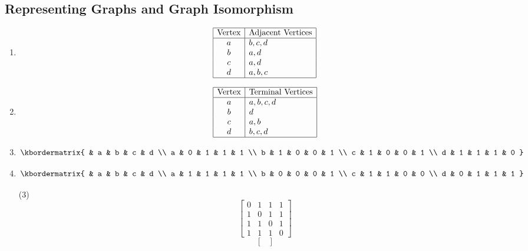 \documentclass[12pt, A4]{article}
\newcommand{\enumset}[1]{\setcounter{enumi}{#1}}
\begin{document}
		\subsection{Representing Graphs and Graph Isomorphism}
			\begin{enumerate}
				\item
					\[\begin{array}{|c|l|}\hline
						\text{Vertex} & \text{Adjacent Vertices} \\\hline
						a & b, c, d \\
						b & a, d\\
						c & a, d \\
						d & a, b, c \\\hline
					\end{array}\]
				\enumset{2}
				\item
					\[\begin{array}{|c|l|}\hline
						\text{Vertex} & \text{Terminal Vertices} \\\hline
						a & a, b, c, d \\
						b & d \\
						c & a, b \\
						d & b, c, d \\\hline
					\end{array}\]
				\enumset{4}
				\item
					\[\kbordermatrix{
								& a & b & c & d \\
								a & 0 & 1 & 1 & 1 \\
								b & 1 & 0 & 0 & 1 \\
								c & 1 & 0 & 0 & 1 \\
								d & 1 & 1 & 1 & 0
					}\]
				\enumset{6}
				\item
					\[\kbordermatrix{
								& a & b & c & d \\
								a & 1 & 1 & 1 & 1 \\
								b & 0 & 0 & 0 & 1 \\
								c & 1 & 1 & 0 & 0 \\
								d & 0 & 1 & 1 & 1
					}\]
				\enumset{8}
					\begin{tasks}(3)
						\task
							\[\begin{bmatrix}
								0 & 1 & 1 & 1 \\
								1 & 0 & 1 & 1 \\
								1 & 1 & 0 & 1 \\
								1 & 1 & 1 & 0 
							\end{bmatrix}\]
						\task
							\[\begin{bmatrix}

\end{bmatrix}\]
\end{tasks}
\end{enumerate}
\end{document}
